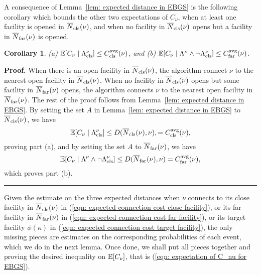 \documentclass[oneside,final]{ucr}
\newtheorem{corollary}[theorem]{Corollary}
\newenvironment{proof}[1][Proof]{\textbf{#1.} }{\ \rule{0.5em}{0.5em}}
\begin{document}
A consequence of Lemma~\ref{lem: expected distance in EBGS} is the
following corollary which bounds the other two expectations
of $C_\nu$, when at least one facility is opened in ${\overline{N}}_{{\mbox{\scriptsize\rm cls}}}(\nu)$,
and when no facility in ${\overline{N}}_{{\mbox{\scriptsize\rm cls}}}(\nu)$ opens but a facility in
${\overline{N}}_{{\mbox{\scriptsize\rm far}}}(\nu)$ is opened.


\begin{corollary} \label{coro: EBGS close and far distance} 
%
{\rm (a)} $\mathbb{E}[C_{\nu} \mid \Lambda_{{\mbox{\scriptsize\rm cls}}}^\nu] \leq C_{{\mbox{\scriptsize\rm cls}}}^{{\mbox{\scriptsize\rm avg}}}(\nu)$,
and
{\rm (b)} $\mathbb{E}[C_{\nu} \mid \Lambda^\nu \wedge \neg \Lambda_{{\mbox{\scriptsize\rm cls}}}^\nu]
    			\leq C_{{\mbox{\scriptsize\rm far}}}^{{\mbox{\scriptsize\rm avg}}}(\nu)$.
\end{corollary}
\begin{proof}
When there is an open facility in ${\overline{N}}_{{\mbox{\scriptsize\rm cls}}}(\nu)$, the algorithm
  connect $\nu$ to the nearest open facility in
  ${\overline{N}}_{{\mbox{\scriptsize\rm cls}}}(\nu)$. When no facility in ${\overline{N}}_{{\mbox{\scriptsize\rm cls}}}(\nu)$ opens but
  some facility in ${\overline{N}}_{{\mbox{\scriptsize\rm far}}}(\nu)$ opens, the algorithm connects
  $\nu$ to the nearest open facility in ${\overline{N}}_{{\mbox{\scriptsize\rm far}}}(\nu)$. The rest of
  the proof follows from Lemma~\ref{lem: expected distance in
    EBGS}. By setting the set $A$ in Lemma~\ref{lem: expected distance
    in EBGS} to ${\overline{N}}_{{\mbox{\scriptsize\rm cls}}}(\nu)$, we have
%
  \begin{equation*}
    \mathbb{E}[C_{\nu} \mid \Lambda_{{\mbox{\scriptsize\rm cls}}}^\nu] \leq D({\overline{N}}_{{\mbox{\scriptsize\rm cls}}}(\nu), \nu),
    = C_{{\mbox{\scriptsize\rm cls}}}^{{\mbox{\scriptsize\rm avg}}}(\nu),
    \label{eqn: expected connection cost close facility}
  \end{equation*}
% 
proving part (a), and by setting the set $A$ to ${\overline{N}}_{{\mbox{\scriptsize\rm far}}}(\nu)$, we have
%
  \begin{equation*}
    \mathbb{E}[C_{\nu}
    \mid \Lambda^\nu \wedge \neg \Lambda_{{\mbox{\scriptsize\rm cls}}}^\nu] \leq
    D({\overline{N}}_{{\mbox{\scriptsize\rm far}}}(\nu), \nu) = C_{{\mbox{\scriptsize\rm far}}}^{{\mbox{\scriptsize\rm avg}}}(\nu),
    \label{eqn: expected connection cost far facility}
  \end{equation*}
which proves part (b).
\end{proof}

Given the estimate on the three expected distances when $\nu$ connects
to its close facility in ${\overline{N}}_{{\mbox{\scriptsize\rm cls}}}(\nu)$ in (\ref{eqn: expected
  connection cost close facility}), or its far facility in
${\overline{N}}_{{\mbox{\scriptsize\rm far}}}(\nu)$ in (\ref{eqn: expected connection cost far
  facility}), or its target facility $\phi(\kappa)$ in (\ref{eqn:
  expected connection cost target facility}), the only missing pieces
are estimates on the corresponding probabilities of each event, which
we do in the next lemma. Once done, we shall put all pieces together
and proving the desired inequality on $\mathbb{E}[C_{\nu}]$, that is
(\ref{eqn: expectation of C_nu for EBGS}).
\end{document}
